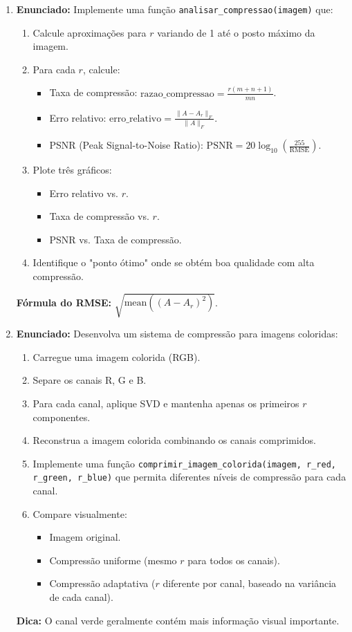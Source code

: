 \documentclass[a4paper,12pt]{article}
\begin{document}
\begin{enumerate}
    \item \textbf{Enunciado:}
    Implemente uma função \texttt{analisar\_compressao(imagem)} que:
    \begin{enumerate}
        \item Calcule aproximações para $r$ variando de 1 até o posto máximo da imagem.
        \item Para cada $r$, calcule:
        \begin{itemize}
            \item Taxa de compressão: $\text{razao\_compressao} = \frac{r(m+n+1)}{mn}$.
            \item Erro relativo: $\text{erro\_relativo} = \frac{\|A - A_r\|_F}{\|A\|_F}$.
            \item PSNR (Peak Signal-to-Noise Ratio): $\text{PSNR} = 20 \log_{10}\left(\frac{255}{\text{RMSE}}\right)$.
        \end{itemize}
        \item Plote três gráficos:
        \begin{itemize}
            \item Erro relativo vs. $r$.
            \item Taxa de compressão vs. $r$.
            \item PSNR vs. Taxa de compressão.
        \end{itemize}
        \item Identifique o "ponto ótimo" onde se obtém boa qualidade com alta compressão.
    \end{enumerate}
    \textbf{Fórmula do RMSE:} $\sqrt{\text{mean}((A - A_r)^2)}$.
    \item \textbf{Enunciado:}
    Desenvolva um sistema de compressão para imagens coloridas:
    \begin{enumerate}
        \item Carregue uma imagem colorida (RGB).
        \item Separe os canais R, G e B.
        \item Para cada canal, aplique SVD e mantenha apenas os primeiros $r$ componentes.
        \item Reconstrua a imagem colorida combinando os canais comprimidos.
        \item Implemente uma função \texttt{comprimir\_imagem\_colorida(imagem, r\_red, r\_green, r\_blue)} que permita diferentes níveis de compressão para cada canal.
        \item Compare visualmente:
        \begin{itemize}
            \item Imagem original.
            \item Compressão uniforme (mesmo $r$ para todos os canais).
            \item Compressão adaptativa ($r$ diferente por canal, baseado na variância de cada canal).
        \end{itemize}
    \end{enumerate}
    \textbf{Dica:} O canal verde geralmente contém mais informação visual importante.


\end{enumerate}
\end{document}
